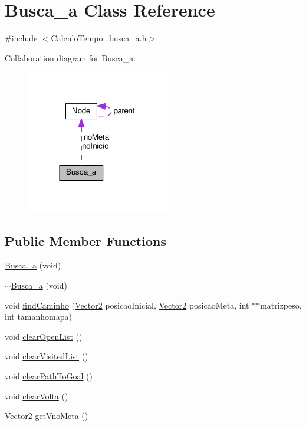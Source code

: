 \hypertarget{classBusca__a}{}\section{Busca\+\_\+a Class Reference}
\label{classBusca__a}


{\ttfamily \#include $<$Calculo\+Tempo\+\_\+busca\+\_\+a.\+h$>$}



Collaboration diagram for Busca\+\_\+a\+:
\nopagebreak
\begin{figure}[H]
\begin{center}
\leavevmode
\includegraphics[width=177pt]{classBusca__a__coll__graph}
\end{center}
\end{figure}
\subsection*{Public Member Functions}
\begin{DoxyCompactItemize}
\item 
\hyperlink{classBusca__a_a0248057d168285a7f4170260e0a7d6fd}{Busca\+\_\+a} (void)
\item 
\hyperlink{classBusca__a_a0564edf56bb93beee21ee20bc698f9b7}{$\sim$\+Busca\+\_\+a} (void)
\item 
void \hyperlink{classBusca__a_a44a28d3e129d1514224274c305a9ffe5}{find\+Caminho} (\hyperlink{structVector2}{Vector2} posicao\+Inicial, \hyperlink{structVector2}{Vector2} posicao\+Meta, int $\ast$$\ast$matrizpeso, int tamanhomapa)
\item 
void \hyperlink{classBusca__a_aa78c0ef7d31f109d51084653c1459366}{clear\+Open\+List} ()
\item 
void \hyperlink{classBusca__a_ad0f829f9278cddaaf3f0b7c2298c4c33}{clear\+Visited\+List} ()
\item 
void \hyperlink{classBusca__a_ad87be185f608f065f959f1a4ff2d84cc}{clear\+Path\+To\+Goal} ()
\item 
void \hyperlink{classBusca__a_a87c18400efc74dcec7cf97cec2ebed83}{clear\+Volta} ()
\item 
\hyperlink{structVector2}{Vector2} \hyperlink{classBusca__a_a6f9dc9136b0e34329b19ac6cce7956e8}{get\+Vno\+Meta} ()
\end{DoxyCompactItemize}
